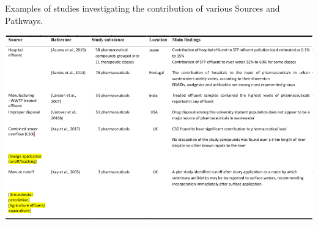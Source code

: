 \documentclass{article}
\begin{document}
\begin{landscape}
\begin{table}
  \caption{Examples of studies investigating the contribution of various Sources and Pathways.}
  \label{table_sources}
  \includegraphics[width=\linewidth]{Table1.png}
\end{table}
\nocite{Santos2013ContributionPharmaceuticals,Azuma2019EnvironmentalJapan,Larsson2007EffluentPharmaceuticals,Vatovec2016InvestigatingSetting,Kay2017WidespreadWaters,Kay2005TransportLand}

  
  


\end{landscape}
\end{document}

